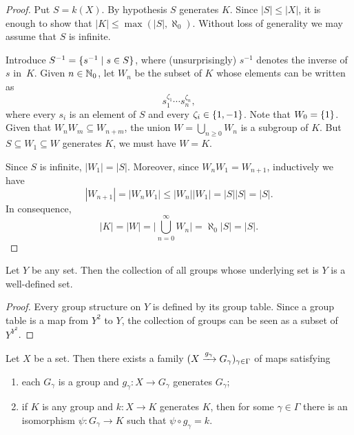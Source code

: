 \begin{proof}
    Put $S=k(X)$. By hypothesis $S$ generates $K$. Since $|S|\le|X|$, it is enough to show that $|K|\le\max(|S|,\aleph_0)$. Without loss of generality we may assume that $S$ is infinite.

    Introduce $S^{-1}=\{s^{-1}\mid s\in S\}$, where (unsurprisingly) $s^{-1}$ denotes the inverse of~$s$ in~$K$. Given $n\in\mathbb{N}_0$, let $W_n$ be the subset of $K$ whose elements can be written as
    $$
        s_1^{\zeta_1}\cdots s_n^{\zeta_n},
    $$
    where every $s_i$ is an element of $S$ and every $\zeta_i\in\{1,-1\}$. Note that $W_0=\{1\}$. Given that $W_nW_m\subseteq W_{n+m}$, the union $W=\bigcup_{n\ge0}W_n$ is a subgroup of $K$. But $S\subseteq W_1\subseteq W$ generates $K$, we must have $W=K$.

    Since $S$ is infinite, $|W_1|=|S|$. Moreover, since $W_nW_1 = W_{n+1}$, inductively we have
    $$
        |W_{n+1}|=|W_nW_1|\le|W_n||W_1|=|S||S|=|S|.
    $$
    In consequence,
    $$
        |K| = |W| = \Big|\bigcup_{n=0}^\infty W_n\Big| = \aleph_0|S|=|S|.
    $$
\end{proof}

\begin{lem}\label{lem:free-group-lemma3.2}
    Let\/ $Y$ be any set. Then the collection of all groups whose underlying set is\/ $Y$ is a well-defined set.
\end{lem}

\begin{proof}
    Every group structure on $Y$ is defined by its group table. Since a group table is a map from $Y^2$ to $Y$, the collection of groups can be seen as a subset of~$Y^{Y^2}$.
\end{proof}

\begin{prop}\label{prop:free-group-prop2}
    Let\/ $X$ be a set. Then there exists a family\/ $(X\xrightarrow{g_\gamma}G_\gamma)_{\gamma\in\Gamma}$ of maps satisfying
    \begin{enumerate}[\rm a)]
        \item each\/ $G_\gamma$ is a group and\/ $g_\gamma\colon X\to G_\gamma$ generates\/ $G_\gamma$;
        
        \item if\/ $K$ is any group and\/ $k\colon X\to K$ generates\/ $K$, then for some\/ $\gamma\in\Gamma$ there is an isomorphism\/ $\psi\colon G_\gamma\to K$ such that\/ $\psi \circ g_\gamma=k$.
    \end{enumerate}
\end{prop}

